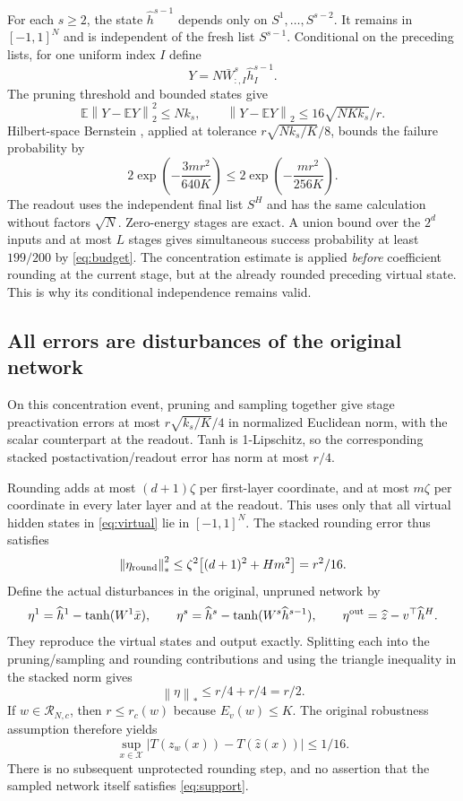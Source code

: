\documentclass[11pt]{article}
\newcommand{\E}{\mathbb E}
\newcommand{\norm}[1]{\left\|#1\right\|}
\begin{document}
For each $s\ge2$, the state $\widehat h^{s-1}$ depends only on
$S^1,\ldots,S^{s-2}$. It remains in $[-1,1]^N$ and is independent of
the fresh list $S^{s-1}$. Conditional on the preceding lists, for one
uniform index $I$ define
\[
 Y=N\bar W^s_{:,I}\widehat h^{s-1}_I.
\]
The pruning threshold and bounded states give
\[
 \E\norm{Y-\E Y}_2^2\le Nk_s,\qquad
 \norm{Y-\E Y}_2\le16\sqrt{NKk_s}/r.
\]
Hilbert-space Bernstein \cite{tarres-yao}, applied at tolerance
$r\sqrt{Nk_s/K}/8$, bounds the failure probability by
\[
 2\exp\!\left(-\frac{3mr^2}{640K}\right)
 \le 2\exp\!\left(-\frac{mr^2}{256K}\right).
\]
The readout uses the independent final list $S^H$ and has the same
calculation without factors $\sqrt N$. Zero-energy stages are exact.
A union bound over the $2^d$ inputs and at most $L$ stages gives
simultaneous success probability at least $199/200$ by \eqref{eq:budget}.
The concentration estimate is applied \emph{before} coefficient rounding
at the current stage, but at the already rounded preceding virtual state.
This is why its conditional independence remains valid.

\subsection{All errors are disturbances of the original network}
On this concentration event, pruning and sampling together give stage
preactivation errors at most $r\sqrt{k_s/K}/4$ in normalized Euclidean
norm, with the scalar counterpart at the readout. Tanh is 1-Lipschitz,
so the corresponding stacked postactivation/readout error has norm at
most $r/4$.

Rounding adds at most $(d+1)\zeta$ per first-layer coordinate, and at
most $m\zeta$ per coordinate in every later layer and at the readout.
This uses only that all virtual hidden states in \eqref{eq:virtual} lie
in $[-1,1]^N$. The stacked rounding error thus satisfies
\[
 \norm{\eta_{\rm round}}_*^2
 \le\zeta^2\bigl[(d+1)^2+Hm^2\bigr]=r^2/16.
\]
Define the actual disturbances in the original, unpruned network by
\[
 \eta^1=\widehat h^1-\tanh(W^1\bar x),\qquad
 \eta^s=\widehat h^s-\tanh(W^s\widehat h^{s-1}),\qquad
 \eta^{\rm out}=\widehat z-v^\top\widehat h^H.
\]
They reproduce the virtual states and output exactly. Splitting each
into the pruning/sampling and rounding contributions and using the
triangle inequality in the stacked norm gives
\begin{equation}\label{eq:noise-budget}
 \norm\eta_*\le r/4+r/4=r/2.
\end{equation}
If $w\in\mathcal R_{N,c}$, then $r\le r_c(w)$ because $E_v(w)\le K$.
The original robustness assumption therefore yields
\begin{equation}\label{eq:approximation}
 \sup_{x\in\mathcal X}|T(z_w(x))-T(\widehat z(x))|\le1/16.
\end{equation}
There is no subsequent unprotected rounding step, and no assertion that
the sampled network itself satisfies \eqref{eq:support}.
\end{document}
